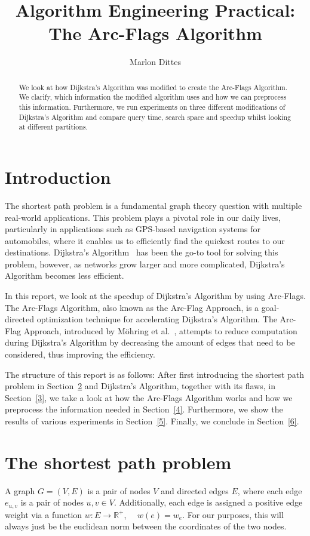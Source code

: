 \documentclass[acmsmall,nonacm,screen,review]{acmart}
\title{Algorithm Engineering Practical: The Arc-Flags Algorithm}
\author{Marlon Dittes}
\affiliation{%
  \institution{Heidelberg University}
  \streetaddress{Im Neuenheimer Feld 205}
  \city{Heidelberg}
  \state{Baden-Württemberg}
  \country{Germany}
  \postcode{69120}
}
\date{}
\begin{document}
\begin{abstract}
We look at how Dijkstra's Algorithm was modified to create the Arc-Flags Algorithm.
We clarify, which information the modified algorithm uses and how we can preprocess this information.
Furthermore, we run experiments on three different modifications of Dijkstra's Algorithm and compare query time, search space and speedup whilst looking at
different partitions.
\end{abstract}
\maketitle

\section{Introduction}
The shortest path problem is a fundamental graph theory question with multiple real-world applications. This problem plays a pivotal role in our daily lives,
particularly in applications such as GPS-based navigation systems for automobiles, where it enables us to efficiently find the quickest
routes to our destinations. Dijkstra's Algorithm~\cite{DBLP:books/mc/22/Dijkstra22a} has been the go-to tool for solving this problem, however, as networks grow larger and more complicated,
Dijkstra's Algorithm becomes less efficient.

In this report, we look at the speedup of Dijkstra's Algorithm by using Arc-Flags.
The Arc-Flags Algorithm, also known as the Arc-Flag Approach, is a goal-directed optimization technique for accelerating Dijkstra's Algorithm. The Arc-Flag
Approach, introduced by Möhring et al.~\cite{DBLP:journals/jea/MohringSSWW06},
attempts to reduce computation during Dijkstra's Algorithm by decreasing the amount of edges
that need to be considered, thus improving the efficiency.

The structure of this report is as follows: After first introducing the shortest path problem in Section~\ref{2} and Dijkstra's Algorithm, together
with its flaws, in Section~\ref{3},
we take a look at how the Arc-Flags Algorithm works and how we preprocess the information needed in Section~\ref{4}.
Furthermore, we show the results of various experiments in Section~\ref{5}.
Finally, we conclude in Section~\ref{6}.

\section{The shortest path problem}
\label{2}
A graph $G = (V,E)$ is a pair of nodes $V$ and directed edges $E$, where each edge $e_{u,v}$ is a pair of nodes $u,v \in V$.
Additionally, each edge is assigned a positive edge weight via a function $w \colon E \to \mathbb{R}^{+}$, $\quad w(e) = w_{e}$. For our purposes, this will
always just be the euclidean norm between the coordinates of the two nodes.
\end{document}
